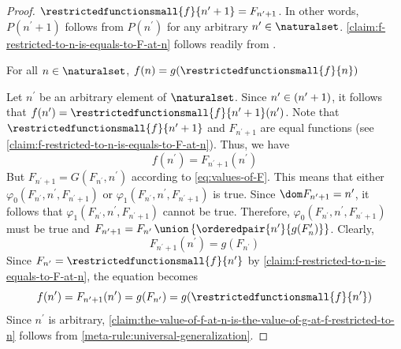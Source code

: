 \begin{proof}
    \( \restrictedfunctionsmall{f}{n^{\prime} + 1 } = F_{n^{\prime} + 1}  \).
    In other words, \( P(n^{\prime} + 1) \) follows from \( P(n^{\prime}) \) for any arbitrary \( n^{\prime} \in \naturalset \).
    \cref{claim:f-restricted-to-n-is-equals-to-F-at-n} follows readily from .
    \begin{claim}
         \label{claim:the-value-of-f-at-n-is-the-value-of-g-at-f-restricted-to-n}
        For all \( n \in \naturalset \), \( f(n) = g( \restrictedfunctionsmall{f}{n} ) \)
    \end{claim}
    \noindent
    Let \( n^{\prime} \) be an arbitrary element of \( \naturalset \).
    Since \( n^{\prime} \in \mleft( n^{\prime} + 1 \mright) \), it follows that
    \( f(n^{\prime}) = \restrictedfunctionsmall{f}{n^{\prime} + 1}(n^{\prime}) \).
    Note that \( \restrictedfunctionsmall{f}{n^{\prime} + 1} \) and \( F_{n^{\prime} + 1} \) are equal functions (see \cref{claim:f-restricted-to-n-is-equals-to-F-at-n}).
    Thus, we have
    \begin{equation*}
        f(n^{\prime}) = F_{n^{\prime} + 1}(n^{\prime})
    \end{equation*}
    But \( F_{n^{\prime} + 1} = G(F_{n^{\prime}}, n^{\prime}) \) according to \eqref{eq:values-of-F}.
    This means that either \( \varphi_{0}(F_{n^{\prime}}, n^{\prime}, F_{n^{\prime} + 1}) \) or
    \( \varphi_{1}(F_{n^{\prime}}, n^{\prime}, F_{n^{\prime} + 1}) \) is true.
    Since \( \dom F_{n^{\prime} + 1} = n^{\prime} \),
    it follows that \( \varphi_{1}(F_{n^{\prime}}, n^{\prime}, F_{n^{\prime} + 1}) \) cannot be true.
    Therefore, \( \varphi_{0}(F_{n^{\prime}}, n^{\prime}, F_{n^{\prime} + 1}) \) must be true
    and \( F_{n^{\prime} + 1} = F_{n^{\prime}} \,{\union}\, \mleft\{ \orderedpair{n^{\prime}}{g(F_n^{\prime})} \mright\} \).
    Clearly,
    \begin{equation*}
        F_{n^{\prime} + 1}(n^{\prime}) = g(F_{n^{\prime}})
    \end{equation*}
    Since \( F_{n^{\prime}} = \restrictedfunctionsmall{f}{n^{\prime}} \) by \cref{claim:f-restricted-to-n-is-equals-to-F-at-n}, the equation becomes
    \begin{equation*}
        f(n^{\prime}) = F_{n^{\prime} + 1}(n^{\prime}) = g(F_{n^{\prime}}) = g( \restrictedfunctionsmall{f}{n^{\prime}} )
    \end{equation*}
    Since \( n^{\prime} \) is arbitrary, \cref{claim:the-value-of-f-at-n-is-the-value-of-g-at-f-restricted-to-n} follows from
    \cref{meta-rule:universal-generalization}.


\end{proof}

